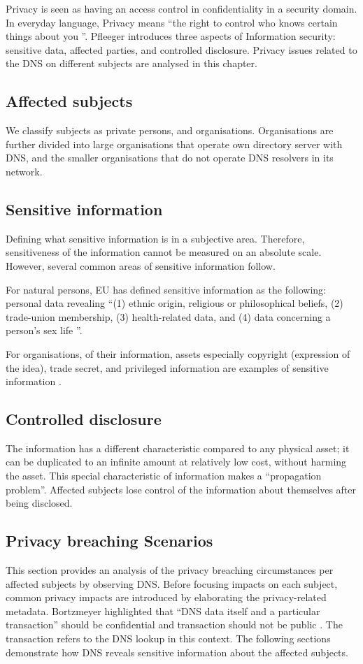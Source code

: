 Privacy is seen as having an access control in confidentiality in a security domain.
In everyday language, Privacy means ``the right to control who knows certain things about you \cite{securityincomputing}''.
Pfleeger introduces three aspects of Information security: sensitive data, affected parties, and controlled disclosure.
Privacy issues related to the DNS on different subjects are analysed in this chapter.

\subsection{Affected subjects}
We classify subjects as private persons, and organisations. Organisations are further divided into large organisations that operate own directory server with DNS, and the smaller organisations that do not operate DNS resolvers in its network.

\subsection{Sensitive information}\label{sensitiveinformation}
Defining what sensitive information is in a subjective area.
Therefore, sensitiveness of the information cannot be measured on an absolute scale. However, several common areas of sensitive information follow.

For natural persons, EU has defined sensitive information as the following: personal data revealing ``(1) ethnic origin, religious or philosophical beliefs, (2) trade-union membership, (3) health-related data, and (4) data concerning a person's sex life \cite{GDPR}''.

For organisations, of their information, assets especially copyright (expression of the idea), trade secret, and privileged information are examples of sensitive information \cite{securityincomputing}.

\subsection{Controlled disclosure}
The information has a different characteristic compared to any physical asset; it can be duplicated to an infinite amount at relatively low cost, without harming the asset.
This special characteristic of information makes a ``propagation problem''.
Affected subjects lose control of the information about themselves after being disclosed.

\subsection{Privacy breaching Scenarios}
This section provides an analysis of the privacy breaching circumstances per affected subjects by observing DNS. Before focusing impacts on each subject, common privacy impacts are introduced by elaborating the privacy-related metadata.
Bortzmeyer highlighted that ``DNS data itself and a particular transaction'' should be confidential and transaction should not be public \cite{rfc7626}. The transaction refers to the DNS lookup in this context.
The following sections demonstrate how DNS reveals sensitive information about the affected subjects.

